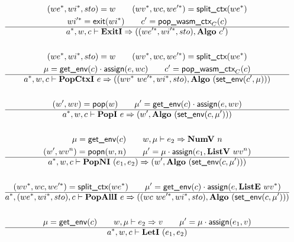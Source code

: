 \newpage
\begin{gather*}
%
\newline \\
  (\seq{we}, \seq{wi}, sto) = w \qquad
  (\seq{wv}, wc, \seq{we'}) = \splitctx(\seq{we}) \\
  \seq{wi'} = \exit(\seq{wi}) \qquad
  c' = \popwasmctx_{C}(c) \\
  \hline
  \seq{a}, w, c \vdash \exiti
  \Rightarrow
  ((\seq{we'}, \seq{wi'}, sto), \algo ~ c') \\
%
\newline \\
  (\seq{we}, \seq{wi}, sto) = w \qquad
  (\seq{wv}, wc, \seq{we'}) = \splitctx(\seq{we}) \\
  \mu = \getenv(c) \cdot \assign(e, wc) \qquad
  c' = \popwasmctx_{C}(c) \\
  \hline
  \seq{a}, w, c \vdash \popctxi ~ e
  \Rightarrow
  ((\seq{wv} ~ \seq{we'}, \seq{wi}, sto), \algo ~ (\setenv(c', \mu))) \\
%
\newline \\
  (w', wv) = \pop(w) \qquad
  \mu' = \getenv(c) \cdot \assign(e, wv) \\
  \hline
  \seq{a}, w, c \vdash \popi ~ e \Rightarrow (w', \algo ~ (\setenv(c, \mu'))) \\
%
\newline \\
  \mu = \getenv(c) \qquad
  w, \mu \vdash e_2 \Rightarrow \numv ~ n \\
  (w', wv^n) = \popn(w, n) \qquad
  \mu' = \mu \cdot \assign(e_1, \listv ~ wv^n) \\
  \hline
  \seq{a}, w, c \vdash \popni ~ (e_1, e_2) \Rightarrow
  (w', \algo ~ (\setenv(c, \mu'))) \\
%
\newline \\
  (\seq{wv}, wc, \seq{we'}) = \splitctx(\seq{we}) \qquad
  \mu' = \getenv(c) \cdot \assign(e, \liste ~ \seq{wv}) \\
  \hline
  \seq{a}, (\seq{we}, \seq{wi}, sto), c \vdash \popalli ~ e
  \Rightarrow
  ((wc ~ \seq{we'}, \seq{wi}, sto), \algo ~ (\setenv(c, \mu'))) \\
%
\newline \\
  \mu = \getenv(c) \qquad
  w, \mu \vdash e_2 \Rightarrow v \qquad
  \mu' = \mu \cdot \assign(e_1, v) \\
  \hline
  \seq{a}, w, c \vdash \leti ~ (e_1, e_2)

\end{gather*}
